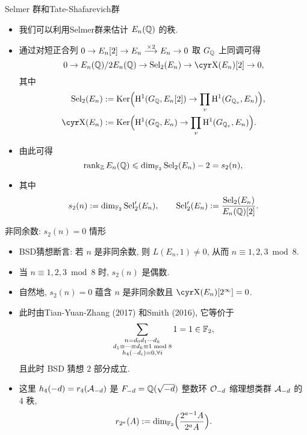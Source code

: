 \documentclass[handout,aspectratio=169]{ctexbeamer}
\begin{document}
\begin{frame}{Selmer 群和Tate-Shafarevich群}
	\begin{itemize}
		\item 我们可以利用Selmer群来估计 $E_n({\mathbb{Q}})$ 的秩.
		\item 通过对短正合列 $0\rightarrow E_n[2]\rightarrow E_n\stackrel{\times2}{\longrightarrow} E_n\rightarrow 0$ 取 $G_{\mathbb{Q}}$ 上同调可得
		\[
			0\ra E_n(\BQ)/2E_n(\BQ)\ra \Sel_2(E_n)\ra \Sha(E_n)[2]\ra0,
		\]
		其中
		\begin{align*}
			\Sel_2(E_n)&:=\Ker\Bigl(\RH^1(G_\BQ,E_n[2])\ra\prod_v \RH^1(G_{\BQ_v},E_n)\Bigr),\\
			\Sha(E_n)&:=\Ker\Bigl(\RH^1(G_\BQ,E_n)\ra\prod_v \RH^1(G_{\BQ_v},E_n)\Bigr).
		\end{align*}
		\item 由此可得
		\[
			\operatorname{rank}_{\mathbb{Z}} E_n({\mathbb{Q}})\leqslant \dim_{{\mathbb{F}}_2}{\mathrm{Sel}}_2(E_n)-2=s_2(n),
		\]
		\item 其中
		\[
			s_2(n):=\dim_{{\mathbb{F}}_2}{\mathrm{Sel}}'_2(E_n),\qquad
			{\mathrm{Sel}}'_2(E_n):=\frac{{\mathrm{Sel}}_2(E_n)}{E_n({\mathbb{Q}})[2]}.
		\]
	\end{itemize}
\end{frame}


\begin{frame}{非同余数: $s_2(n)=0$ 情形}
	\begin{itemize}
		\item BSD猜想断言: 若 $n$ 是非同余数, 则 $L(E_n,1)\ne 0$, 从而 $n\equiv 1,2,3\bmod 8$.
		\item 当 $n\equiv 1,2,3\bmod 8$ 时, $s_2(n)$ 是偶数.
		\item 自然地, $s_2(n)=0$ 蕴含 $n$ 是非同余数且 $\Sha(E_n)[2^\infty]=0$.
		\item 此时由Tian-Yuan-Zhang (2017) 和Smith (2016), 它等价于
		\[
			\sum_{\substack{n=d_0d_1\cdots d_k\\ d_1\equiv\dots\equiv d_k\equiv 1\bmod 8\\ h_4(-d_i)=0,\forall i}}1=1\in{\mathbb{F}}_2,
		\]
		且此时 BSD 猜想 $2$ 部分成立.
		\item 这里 $h_4(-d)=r_4({\mathcal{A}}_{-d})$ 是 $F_{-d}={\mathbb{Q}}(\sqrt{-d})$ 整数环 ${\mathcal{O}}_{-d}$ 缩理想类群 ${\mathcal{A}}_{-d}$ 的 $4$ 秩, 
		\[
			r_{2^a}(A):=\dim_{{\mathbb{F}}_2}\Bigl(\frac{2^{a-1} A}{2^a A}\Bigr).
		\]
	\end{itemize}
\end{frame}
\end{document}
